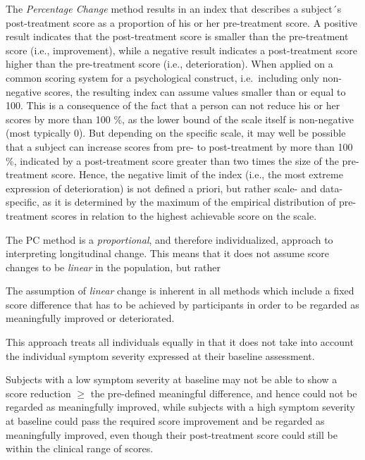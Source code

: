 \documentclass[12pt,twoside]{reedthesis}
\begin{document}
\par

The \emph{Percentage Change} method results in an index that describes a subject´s post-treatment score as a proportion of his or her pre-treatment score. A positive result indicates that the post-treatment score is smaller than the pre-treatment score (i.e., improvement), while a negative result indicates a post-treatment score higher than the pre-treatment score (i.e., deterioration). When applied on a common scoring system for a psychological construct, i.e.~including only non-negative scores, the resulting index can assume values smaller than or equal to 100. This is a consequence of the fact that a person can not reduce his or her scores by more than 100 \%, as the lower bound of the scale itself is non-negative (most typically 0). But depending on the specific scale, it may well be possible that a subject can increase scores from pre- to post-treatment by more than 100 \%, indicated by a post-treatment score greater than two times the size of the pre-treatment score. Hence, the negative limit of the index (i.e., the most extreme expression of deterioration) is not defined a priori, but rather scale- and data-specific, as it is determined by the maximum of the empirical distribution of pre-treatment scores in relation to the highest achievable score on the scale.

\par

The PC method is a \emph{proportional}, and therefore individualized, approach to interpreting longitudinal change. This means that it does not assume score changes to be \emph{linear} in the population, but rather

\par

The assumption of \emph{linear} change is inherent in all methods which include a fixed score difference that has to be achieved by participants in order to be regarded as meaningfully improved or deteriorated.

This approach treats all individuals equally in that it does not take into account the individual symptom severity expressed at their baseline assessment.

Subjects with a low symptom severity at baseline may not be able to show a score reduction \(\geq\) the pre-defined meaningful difference, and hence could not be regarded as meaningfully improved, while subjects with a high symptom severity at baseline could pass the required score improvement and be regarded as meaningfully improved, even though their post-treatment score could still be within the clinical range of scores.
\end{document}
